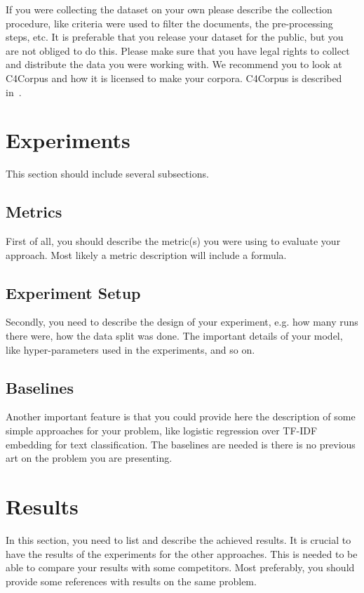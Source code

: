 \documentclass{article}
\begin{document}
If you were collecting the dataset on your own please describe the collection procedure, like criteria were used to filter the documents, the pre-processing steps, etc. It is preferable that you release your dataset for the public, but you are not obliged to do this. Please make sure that you have legal rights to collect and distribute the data you were working with. We recommend you to look at C4Corpus and how it is licensed to make your corpora. C4Corpus is described in~\cite{habernal2016c4corpus}.

\section{Experiments}
This section should include several subsections.
\subsection{Metrics}
First of all, you should describe the metric(s) you were using to evaluate your approach. Most likely a metric description will include a formula.

\subsection{Experiment Setup}
Secondly, you need to describe the design of your experiment, e.g. how many runs there were, how the data split was done. The important details of your model, like hyper-parameters used in the experiments, and so on.

\subsection{Baselines}
Another important feature is that you could provide here the description of some simple approaches for your problem, like logistic regression over TF-IDF embedding for text classification. The baselines are needed is there is no previous art on the problem you are presenting.

\section{Results}
In this section, you need to list and describe the achieved results. It is crucial to have the results of the experiments for the other approaches. This is needed to be able to compare your results with some competitors. Most preferably, you should provide some references with results on the same problem.
\end{document}
